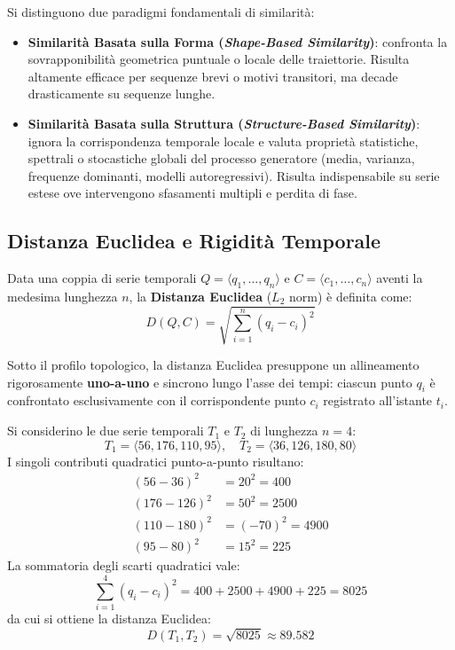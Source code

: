 Si distinguono due paradigmi fondamentali di similarit\`a:
\begin{itemize}
    \item \textbf{Similarit\`a Basata sulla Forma (\textit{Shape-Based Similarity})}: confronta la sovrapponibilit\`a geometrica puntuale o locale delle traiettorie. Risulta altamente efficace per sequenze brevi o motivi transitori, ma decade drasticamente su sequenze lunghe.
    \item \textbf{Similarit\`a Basata sulla Struttura (\textit{Structure-Based Similarity})}: ignora la corrispondenza temporale locale e valuta propriet\`a statistiche, spettrali o stocastiche globali del processo generatore (media, varianza, frequenze dominanti, modelli autoregressivi). Risulta indispensabile su serie estese ove intervengono sfasamenti multipli e perdita di fase.
\end{itemize}

\FloatBarrier
\subsection{Distanza Euclidea e Rigidit\`a Temporale}
\label{subsec:ts-euclidean-distance}

Data una coppia di serie temporali $Q = \langle q_1, \dots, q_n \rangle$ e $C = \langle c_1, \dots, c_n \rangle$ aventi la medesima lunghezza $n$, la \textbf{Distanza Euclidea} ($L_2$ norm) \`e definita come:
\begin{equation}
\label{eq:ts-euclidean-distance}
D(Q, C) = \sqrt{\sum_{i=1}^{n} (q_i - c_i)^2}
\end{equation}

Sotto il profilo topologico, la distanza Euclidea presuppone un allineamento rigorosamente \textbf{uno-a-uno} e sincrono lungo l'asse dei tempi: ciascun punto $q_i$ \`e confrontato esclusivamente con il corrispondente punto $c_i$ registrato all'istante $t_i$.

\begin{example}
\label{ex:euclidean-calculation}
Si considerino le due serie temporali $T_1$ e $T_2$ di lunghezza $n=4$:
\begin{equation*}
T_1 = \langle 56, 176, 110, 95 \rangle, \quad T_2 = \langle 36, 126, 180, 80 \rangle
\end{equation*}
I singoli contributi quadratici punto-a-punto risultano:
\begin{align*}
(56 - 36)^2 &= 20^2 = 400 \\
(176 - 126)^2 &= 50^2 = 2500 \\
(110 - 180)^2 &= (-70)^2 = 4900 \\
(95 - 80)^2 &= 15^2 = 225
\end{align*}
La sommatoria degli scarti quadratici vale:
\begin{equation*}
\sum_{i=1}^{4} (q_i - c_i)^2 = 400 + 2500 + 4900 + 225 = 8025
\end{equation*}
da cui si ottiene la distanza Euclidea:
\begin{equation*}
D(T_1, T_2) = \sqrt{8025} \approx 89.582
\end{equation*}
\end{example}

